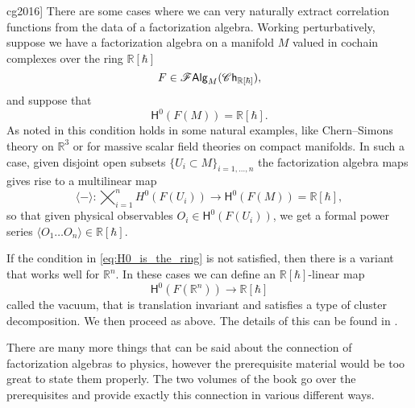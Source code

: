 \documentclass[../text]{subfiles}
\begin{document}
\begin{example}[Correlation Functions][\cite[sec.1.4.4]{cg2016}]
    There are some cases where we can very naturally extract correlation functions from the data of a factorization algebra. Working perturbatively, suppose we have a factorization algebra on a manifold $M$ valued in cochain complexes over the ring $\mathbb{R}[\hbar]$
    \begin{equation}
        F \in \mathscr{F} \mathsf{Alg}_M (\mathscr{C}\mathsf{h}_{\mathbb{R}[\hbar]}),
    \end{equation}
    and suppose that
    \begin{equation}\label{eq:H0_is_the_ring}
        \mathsf{H}^0 (F(M)) = \mathbb{R}[\hbar].
    \end{equation}
    As noted in \cite[sec.1.4.4]{cg2016} this condition holds in some natural examples, like Chern--Simons theory on $\mathbb{R}^3$ or for massive scalar field theories on compact manifolds. In such a case, given disjoint open subsets $\{U_i \subset M\}_{i=1, \dots, n}$ the factorization algebra maps gives rise to a multilinear map
    \begin{equation}
        \langle - \rangle: \bigtimes_{i=1}^{n} H^0(F(U_i)) \xrightarrow{\quad} \mathsf{H}^0 (F(M)) = \mathbb{R}[\hbar],
    \end{equation}
    so that given physical observables $O_i \in \mathsf{H}^0(F(U_i))$, we get a formal power series $\langle O_1 \dots O_n \rangle \in \mathbb{R}[\hbar]$.

    If the condition in \cref{eq:H0_is_the_ring} is not satisfied, then there is a variant that works well for $\mathbb{R}^n$. In these cases we can define an $\mathbb{R}[\hbar]$-linear map
    \begin{equation}
        \mathsf{H}^0(F(\mathbb{R}^n)) \rightarrow \mathbb{R}[\hbar]
    \end{equation}
    called the vacuum, that is translation invariant and satisfies a type of cluster decomposition. We then proceed as above. The details of this can be found in \cite{cg2016}.
\end{example}

There are many more things that can be said about the connection of factorization algebras to physics, however the prerequisite material would be too great to state them properly. The two volumes of the book \cite{cg2016} go over the prerequisites and provide exactly this connection in various different ways.
\end{document}
